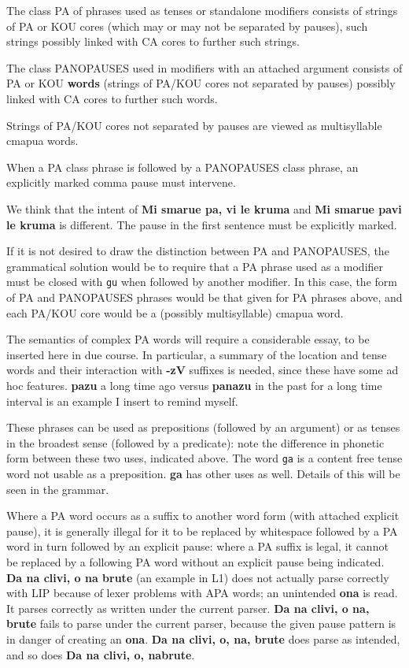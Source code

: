 \documentclass[12pt]{book}
\begin{document}
The class PA of phrases used as tenses or standalone modifiers consists of strings of PA or KOU cores (which may or may not be separated by pauses), such strings possibly linked with CA cores to further such strings.

The class PANOPAUSES used in modifiers with an attached argument consists of  PA or KOU {\bf words\/}  (strings of PA/KOU cores not  separated by pauses) possibly linked with CA cores to further such words.  

Strings of PA/KOU cores not separated by pauses are viewed as multisyllable cmapua words.

When a PA class phrase is followed by a PANOPAUSES class phrase, an explicitly marked comma pause must intervene.

 We think that the intent
of {\bf Mi smarue pa, vi le kruma} and {\bf Mi smarue pavi le kruma} is different.  The pause in the first sentence must be explicitly marked.

If it is not desired to draw the distinction between PA and PANOPAUSES, the grammatical solution would be to require that a PA phrase used as a modifier must be closed with {\tt gu} when followed by another modifier.  In this case, the form of PA and PANOPAUSES phrases would be that given for PA phrases above, and each PA/KOU core would be a (possibly multisyllable) cmapua word.

The semantics of complex PA words will require a considerable essay, to be inserted here in due course.  In particular, a summary of the location and tense words
and their interaction with {\bf -zV} suffixes is needed, since these have some ad hoc features.  {\bf pazu} a long time ago versus {\bf panazu} in the past for a long time interval
is an example I insert to remind myself.

These phrases can be used as prepositions (followed by an argument) or as tenses in the broadest sense (followed by a predicate): note the difference in phonetic form between these two uses, indicated above.  The word {\tt ga} is a content free tense word not usable as a preposition.    {\bf ga} has other uses as well.   Details of this will be seen in the grammar.

Where a PA word occurs as a suffix to another word form (with attached explicit pause), it is generally illegal for it to be replaced by whitespace followed by a PA word in turn followed by an explicit pause:  where a PA suffix is legal, it cannot be replaced by a following PA word without an explicit pause being indicated.  {\bf Da na clivi, o na brute} (an example in L1) does not actually parse correctly with LIP because of lexer problems with APA words; an unintended {\bf ona} is read.  It parses correctly as written under the current parser.  {\bf Da na clivi, o na, brute} fails to parse under the current parser, because the given pause pattern is in danger of creating an {\bf ona}.  {\bf Da na clivi, o, na, brute} does parse as intended, and so does  {\bf Da na clivi, o, nabrute}.
\end{document}
